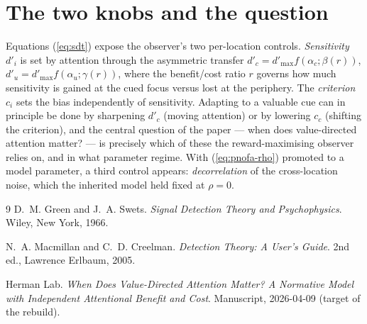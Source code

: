 \documentclass[11pt]{article}
\theoremstyle{remark}
\newcommand{\dprime}{d'}
\begin{document}
\section{The two knobs and the question}
\label{sec:knobs}

Equations (\ref{eq:sdt}) expose the observer's two per-location
controls. \emph{Sensitivity} $\dprime_i$ is set by attention through
the asymmetric transfer
$\dprime_c = \dprime_{\max} f(\alpha_c; \beta(r))$,
$\dprime_u = \dprime_{\max} f(\alpha_u; \gamma(r))$, where the
benefit/cost ratio $r$ governs how much sensitivity is gained at the
cued focus versus lost at the periphery. The \emph{criterion} $c_i$
sets the bias independently of sensitivity. Adapting to a valuable cue
can in principle be done by sharpening $\dprime_c$ (moving attention)
or by lowering $c_c$ (shifting the criterion), and the central
question of the paper --- when does value-directed attention matter?
--- is precisely which of these the reward-maximising observer relies
on, and in what parameter regime. With (\ref{eq:pnofa-rho}) promoted to
a model parameter, a third control appears: \emph{decorrelation} of
the cross-location noise, which the inherited model held fixed at
$\rho = 0$.

\begin{thebibliography}{9}
D.~M. Green and J.~A. Swets.
\emph{Signal Detection Theory and Psychophysics}.
Wiley, New York, 1966.

N.~A. Macmillan and C.~D. Creelman.
\emph{Detection Theory: A User's Guide}.
2nd ed., Lawrence Erlbaum, 2005.

Herman Lab.
\emph{When Does Value-Directed Attention Matter? A Normative Model with
Independent Attentional Benefit and Cost}.
Manuscript, 2026-04-09 (target of the rebuild).
\end{thebibliography}
\end{document}
